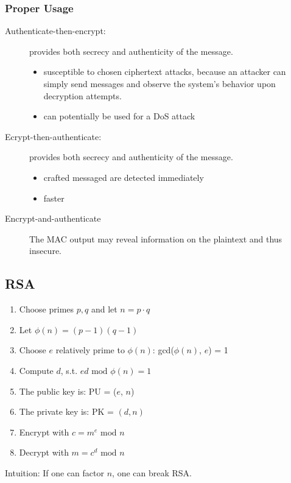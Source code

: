\subsubsection{Proper Usage}
\begin{description}
  \item[Authenticate-then-encrypt:] provides both secrecy and authenticity of the message.
    \begin{itemize}
      \item susceptible to chosen ciphertext attacks, because an attacker can simply send messages and observe the system’s behavior upon
	decryption attempts.
      \item can potentially be used for a DoS attack
    \end{itemize}
  \item[Ecrypt-then-authenticate:] provides both secrecy and authenticity of the message.
    \begin{itemize}
      \item crafted messaged are detected immediately
      \item faster
    \end{itemize}
  \item[Encrypt-and-authenticate]
    The MAC output may reveal information on the plaintext and thus insecure.
\end{description}
\subsection{RSA}
\begin{enumerate}
  \item Choose primes $p,q$ and let $n = p\cdot q$
  \item Let  $\phi(n) = (p-1)(q-1)$
  \item Choose $e$ relatively prime to  $\phi(n)$: gcd($\phi(n)$, $e$) = 1
  \item Compute $d$, s.t. $ed \text{ mod } \phi(n) = 1$
  \item The public key is: PU = ($e$, $n$)
  \item The private key is: PK =  $(d, n)$
  \item Encrypt with $c = m^e \text{ mod } n $
  \item Decrypt with $m = c^d \text{ mod } n$
\end{enumerate}
Intuition: If one can factor $n$, one can break RSA.

